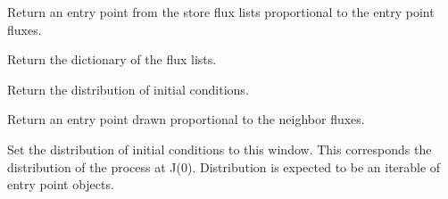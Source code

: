 \documentclass[letterpaper,10pt,english]{sphinxmanual}
\begin{document}
\begin{fulllineitems}
\begin{fulllineitems}
\end{fulllineitems}


\begin{fulllineitems}
\label{applications/applications.doc:window.window.get_entry_point}
Return an entry point from the store flux lists proportional to the entry point fluxes.

\end{fulllineitems}


\begin{fulllineitems}
\label{applications/applications.doc:window.window.get_flux_lists}
Return the dictionary of the flux lists.

\end{fulllineitems}


\begin{fulllineitems}
\label{applications/applications.doc:window.window.get_initial_conditions}
Return the distribution of initial conditions.

\end{fulllineitems}


\begin{fulllineitems}
\label{applications/applications.doc:window.window.reinject}
Return an entry point drawn proportional to the neighbor fluxes.

\end{fulllineitems}


\begin{fulllineitems}
\label{applications/applications.doc:window.window.set_initial_conditions}
Set the distribution of initial conditions to this window. This corresponds the distribution of the process at J(0). Distribution is expected to be an iterable of entry point objects.


\end{fulllineitems}
\end{fulllineitems}
\end{document}
